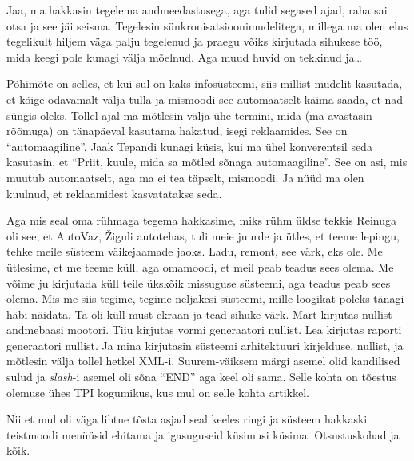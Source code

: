 
Jaa, ma hakkasin tegelema andmeedastusega, aga tulid segased ajad, raha sai 
otsa ja see jäi seisma. Tegelesin sünkronisatsioonimudelitega, millega ma olen 
elus tegelikult hiljem väga palju tegelenud ja praegu võiks kirjutada sihukese 
töö, mida keegi pole kunagi välja mõelnud. Aga muud huvid on tekkinud ja\ldots 


Põhimõte on selles, et kui sul on kaks infosüsteemi, siis millist mudelit 
kasutada, et kõige odavamalt välja tulla ja mismoodi see automaatselt käima 
saada, et nad süngis oleks. Tollel ajal ma mõtlesin välja ühe termini, mida (ma 
avastasin rõõmuga) on  tänapäeval  kasutama hakatud, isegi reklaamides. See on 
\enquote{automaagiline}. Jaak Tepandi kunagi küsis, 
kui ma ühel konverentsil seda kasutasin, et \enquote{Priit, kuule, mida sa 
mõtled sõnaga automaagiline}. See on asi, mis muutub automaatselt, aga ma ei 
tea täpselt, mismoodi. Ja nüüd ma olen kuulnud, et reklaamidest kasvatatakse 
seda. 

Aga mis seal oma rühmaga tegema hakkasime, miks rühm üldse tekkis 
Reinuga oli see, et AutoVaz, Žiguli autotehas, tuli 
meie juurde ja ütles, et teeme lepingu, tehke meile süsteem väikejaamade jaoks. 
Ladu, remont, see värk, eks ole. Me ütlesime, et me teeme küll, aga omamoodi, 
et meil peab teadus sees olema. Me võime ju kirjutada küll teile ükskõik 
missuguse süsteemi, aga teadus peab sees olema. Mis me siis tegime, tegime 
neljakesi süsteemi, mille loogikat poleks tänagi häbi näidata. Ta oli küll must 
ekraan ja tead sihuke värk. Mart kirjutas nullist 
andmebaasi mootori. Tiiu kirjutas vormi generaatori 
nullist. Lea kirjutas raporti generaatori nullist. Ja 
mina kirjutasin süsteemi arhitektuuri kirjelduse,  nullist, ja mõtlesin välja 
tollel hetkel XML-i. Suurem-väiksem märgi asemel olid kandilised sulud ja 
\emph{slash}-i asemel oli sõna \enquote{END} aga keel oli sama. Selle kohta on 
tõestus olemuse ühes TPI kogumikus, kus mul on selle kohta artikkel. 

Nii et mul oli väga lihtne tõsta asjad seal keeles ringi ja süsteem hakkaski 
teistmoodi menüüsid ehitama ja igasuguseid küsimusi küsima. Otsustuskohad ja 
kõik.


